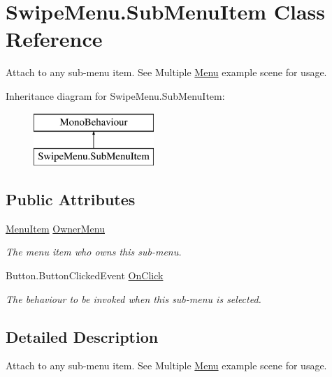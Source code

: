 \hypertarget{class_swipe_menu_1_1_sub_menu_item}{}\section{Swipe\+Menu.\+Sub\+Menu\+Item Class Reference}
\label{class_swipe_menu_1_1_sub_menu_item}


Attach to any sub-\/menu item. See Multiple \hyperlink{class_swipe_menu_1_1_menu}{Menu} example scene for usage.  


Inheritance diagram for Swipe\+Menu.\+Sub\+Menu\+Item\+:\begin{figure}[H]
\begin{center}
\leavevmode
\includegraphics[height=2.000000cm]{class_swipe_menu_1_1_sub_menu_item}
\end{center}
\end{figure}
\subsection*{Public Attributes}
\begin{DoxyCompactItemize}
\item 
\hyperlink{class_swipe_menu_1_1_menu_item}{Menu\+Item} \hyperlink{class_swipe_menu_1_1_sub_menu_item_a2f73caa38f0e82a3fe5505d43d759155}{Owner\+Menu}
\begin{DoxyCompactList}\small\item\em The menu item who owns this sub-\/menu. \end{DoxyCompactList}\item 
Button.\+Button\+Clicked\+Event \hyperlink{class_swipe_menu_1_1_sub_menu_item_aa295509f434ae03d0f8e4c2e11a6e998}{On\+Click}
\begin{DoxyCompactList}\small\item\em The behaviour to be invoked when this sub-\/menu is selected. \end{DoxyCompactList}\end{DoxyCompactItemize}


\subsection{Detailed Description}
Attach to any sub-\/menu item. See Multiple \hyperlink{class_swipe_menu_1_1_menu}{Menu} example scene for usage. 



